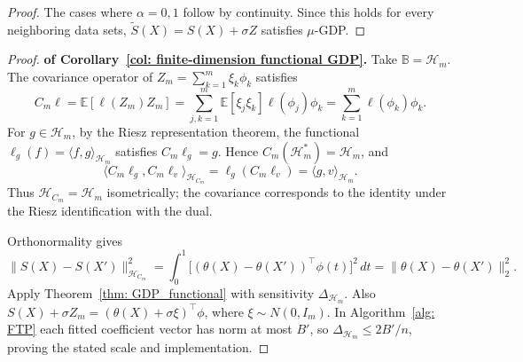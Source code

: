 \begin{proof}
The cases where $\alpha=0,1$ follow by continuity. Since this holds for every neighboring data sets, $\widetilde S(X)=S(X)+\sigma Z$ satisfies $\mu$-GDP.
\end{proof}

\begin{proof}\textbf{of Corollary~\ref{col: finite-dimension functional GDP}.}
Take $\mathbb B=\mathcal H_m$. The covariance operator of $Z_m=\sum_{k=1}^m\xi_k\phi_k$ satisfies
\[
C_m\ell=\mathbb E[\ell(Z_m)Z_m]
=\sum_{j,k=1}^m\mathbb E[\xi_j\xi_k]\ell(\phi_j)\phi_k
=\sum_{k=1}^m\ell(\phi_k)\phi_k.
\]
For $g\in\mathcal H_m$, by the Riesz representation theorem, the functional $\ell_g(f)=\langle f,g\rangle_{\mathcal H_m}$ satisfies $C_m\ell_g=g$. Hence $C_m(\mathcal H_m^*)=\mathcal H_m$, and
\[
\langle C_m\ell_g,C_m\ell_v\rangle_{\mathcal H_{C_m}}
=\ell_g(C_m\ell_v)=\langle g,v\rangle_{\mathcal H_m}.
\]
Thus $\mathcal H_{C_m}=\mathcal H_m$ isometrically; the covariance corresponds to the identity under the Riesz identification with the dual.

Orthonormality gives
\[
\|S(X)-S(X')\|_{\mathcal H_{C_m}}^2
=\int_0^1\bigl[(\theta(X)-\theta(X'))^\top\phi(t)\bigr]^2\,dt
=\|\theta(X)-\theta(X')\|_2^2.
\]
Apply Theorem~\ref{thm: GDP_functional} with sensitivity $\Delta_{\mathcal{H}_m}$. Also $S(X)+\sigma Z_m=(\theta(X)+\sigma\xi)^\top\phi$, where $\xi\sim N(0,I_m)$. In Algorithm~\ref{alg: FTP} each fitted coefficient vector has norm at most $B'$, so $\Delta_{\mathcal{H}_m}\le2B'/n$, proving the stated scale and implementation.
\end{proof}

